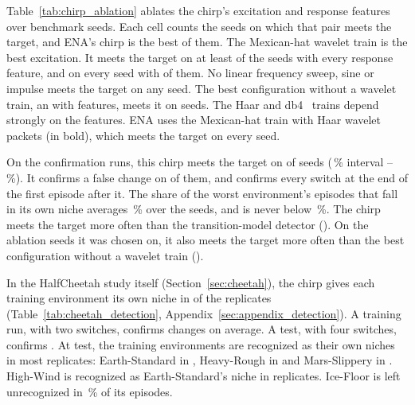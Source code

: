 Table~\ref{tab:chirp_ablation} ablates the chirp's excitation and response features over  benchmark seeds. Each cell counts the seeds on which that pair meets the target, and ENA's chirp is the best of them. The Mexican-hat wavelet train is the best excitation. It meets the target on at least  of the  seeds with every response feature, and on every seed with  of them. No linear frequency sweep, sine or impulse meets the target on any seed. The best configuration without a wavelet train, an  with  features, meets it on  seeds. The Haar and db4~\cite{daubechies1988orthonormal} trains depend strongly on the features. ENA uses the Mexican-hat train with Haar wavelet packets (in bold), which meets the target on every seed.

On the confirmation runs, this chirp meets the target on  of  seeds (\,\% interval --\,\%). It confirms a false change on  of them, and confirms every switch at the end of the first episode after it. The share of the worst environment's episodes that fall in its own niche averages \,\% over the seeds, and is never below \,\%. The chirp meets the target more often than the transition-model detector (). On the  ablation seeds it was chosen on, it also meets the target more often than the best configuration without a wavelet train ().

In the HalfCheetah study itself (Section~\ref{sec:cheetah}), the chirp gives each training environment its own niche in  of the  replicates (Table~\ref{tab:cheetah_detection}, Appendix~\ref{sec:appendix_detection}). A training run, with two switches, confirms  changes on average. A test, with four switches, confirms . At test, the training environments are recognized as their own niches in most replicates: Earth-Standard in , Heavy-Rough in  and Mars-Slippery in . High-Wind is recognized as Earth-Standard's niche in  replicates. Ice-Floor is left unrecognized in \,\% of its episodes.

